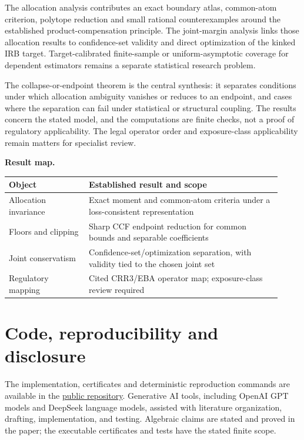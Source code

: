 \documentclass[a4paper,10pt]{article}
\begin{document}
The allocation analysis contributes an exact boundary atlas, common-atom
criterion, polytope reduction and small rational counterexamples around the
established product-compensation principle.  The joint-margin analysis links
those allocation results to confidence-set validity and direct optimization of
the kinked IRB target.  Target-calibrated finite-sample or uniform-asymptotic
coverage for dependent estimators remains a separate statistical research
problem.

The collapse-or-endpoint theorem is the central synthesis: it separates
conditions under which allocation ambiguity vanishes or reduces to an endpoint,
and cases where the separation can fail under statistical or structural coupling.  The results concern the stated model, and the computations are finite checks,
not a proof of regulatory applicability. The legal operator order and
exposure-class applicability remain matters for specialist review.

\begin{samepage}
\par\medskip
\noindent\textbf{Result map.}
\begin{center}
\centering
\begin{tabular}{p{0.27\linewidth}p{0.65\linewidth}}
\toprule
Object & Established result and scope \\
\midrule
Allocation invariance & Exact moment and common-atom criteria under a loss-consistent representation \\
Floors and clipping & Sharp CCF endpoint reduction for common bounds and separable coefficients \\
Joint conservatism & Confidence-set/optimization separation, with validity tied to the chosen joint set \\
Regulatory mapping & Cited CRR3/EBA operator map; exposure-class review required \\
\bottomrule
\end{tabular}
\end{center}
\end{samepage}

\section*{Code, reproducibility and disclosure}

The implementation, certificates and deterministic reproduction commands are
available in the
\href{https://github.com/Maar10Herr/Capital-Consistency-Public}{public repository}.
Generative AI tools, including OpenAI GPT models and DeepSeek language models,
assisted with literature organization, drafting, implementation, and testing.
Algebraic claims are stated and proved in the paper; the executable
certificates and tests have the stated finite scope.



\end{document}
